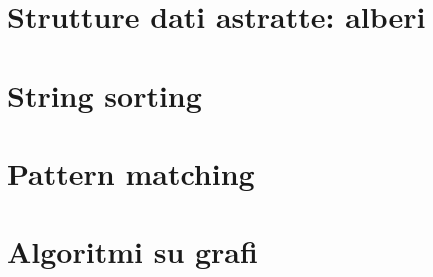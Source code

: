 \documentclass[italian, twoside, isWIP]{../../../Resources/Utils/ClassNotes}
\begin{document}

\section{Strutture dati astratte: alberi}


\section{String sorting}


\section{Pattern matching}


\section{Algoritmi su grafi}

\end{document}
